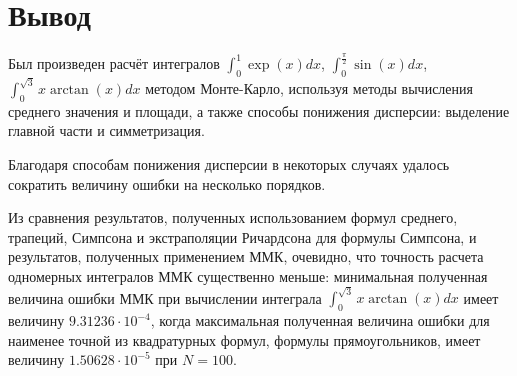 \documentclass[
11pt,
master, %
subf, %
href, %
colorlinks=true, %
times, %
]{disser}
\begin{document}
\newpage
\section{Вывод}
Был произведен расчёт интегралов $\int_{0}^{1}\exp(x)dx$, $\int_{0}^{\frac{\pi}{2}} \sin(x)dx$, $\int_{0}^{\sqrt{3}} x\arctan(x)dx$ методом Монте-Карло, используя методы вычисления среднего значения и площади, а также способы понижения дисперсии: выделение главной части и симметризация.

Благодаря способам понижения дисперсии в некоторых случаях удалось сократить величину ошибки на несколько порядков.

Из сравнения результатов, полученных использованием формул среднего, трапеций, Симпсона и экстраполяции Ричардсона для формулы Симпсона, и результатов, полученных применением ММК, очевидно, что точность расчета одномерных интегралов ММК существенно меньше: минимальная полученная величина ошибки ММК при вычислении интеграла $\int_{0}^{\sqrt{3}} x\arctan(x)dx$ имеет величину $9.31236\cdot 10^{-4}$, когда максимальная полученная величина ошибки для наименее точной из квадратурных формул, формулы прямоугольников, имеет величину $1.50628\cdot 10^{-5}$ при $N=100$.
\end{document}
